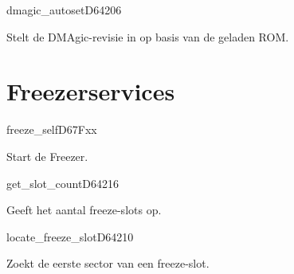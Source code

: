 \begin{hyppotrap}{dmagic\_autoset}{D642}{06}

\item [Dienst:]  Stelt de DMAgic-revisie in op basis van de geladen ROM.
\item [Geschiedenis:]
\end{hyppotrap}



\newpage
\section{Freezerservices}


\begin{hyppotrap}{freeze\_self}{D67F}{xx}

\item [Dienst:]  Start de Freezer.
\item [Geschiedenis:]
\end{hyppotrap}


\begin{hyppotrap}{get\_slot\_count}{D642}{16}

\item [Dienst:]  Geeft het aantal freeze-slots op.
\item [Geschiedenis:]
\end{hyppotrap}


\begin{hyppotrap}{locate\_freeze\_slot}{D642}{10}

\item [Dienst:]  Zoekt de eerste sector van een freeze-slot.
\item [Geschiedenis:]
\end{hyppotrap}


